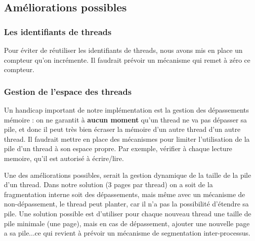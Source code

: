 \documentclass[a4paper,10pt]{article}
\begin{document}
\subsection{Améliorations possibles}

\subsubsection{Les identifiants de threads}

Pour éviter de réutiliser les identifiants de threads, nous avons mis en place
un compteur qu'on incrémente. Il faudrait prévoir un mécanisme qui remet à zéro
ce compteur.

\subsubsection{Gestion de l'espace des threads}

Un handicap important de notre implémentation est la gestion des dépassements
mémoire : on ne garantit à \textbf{aucun moment} qu'un thread ne va pas dépasser
sa pile, et donc il peut très bien écraser la mémoire d'un autre thread d'un
autre thread. Il faudrait mettre en place des mécanismes pour limiter
l'utilisation de la pile d'un thread à son espace propre. Par exemple, vérifier
à chaque lecture memoire, qu'il est autorisé à écrire/lire.

Une des améliorations possibles, serait la gestion dynamique de la taille
de la pile d'un thread. Dans notre solution (3 pages par thread) on a soit de
la fragmentation interne soit des dépassements, mais même avec un mécanisme de
non-dépassement, le thread peut planter, car il n'a pas la possibilité
d'étendre sa pile. Une solution possible est d'utiliser pour
chaque nouveau thread une taille de pile minimale (une page), mais en cas de
dépassement, ajouter une nouvelle page a sa pile...ce qui revient à prévoir un
mécanisme de segmentation inter-processus.
\end{document}
